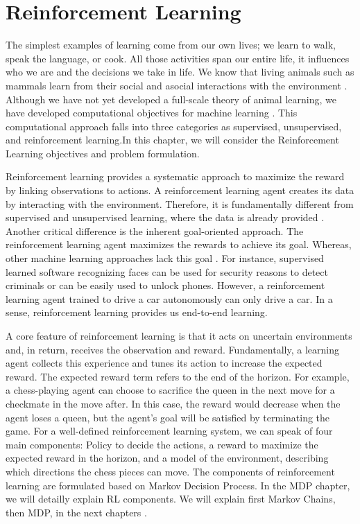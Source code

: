 
\section{Reinforcement Learning}

The simplest examples of learning come from our own lives; we learn to walk, speak the language, or cook. All those activities span our entire life, it influences who we are and the decisions we take in life. We know that living animals such as mammals learn from their social and asocial interactions with the environment \cite{AnimalInt11}. 
Although we have not yet developed a full-scale theory of animal learning, we have developed computational objectives for machine learning \cite{Sutton2018}. 
This computational approach falls into three categories as supervised, unsupervised, and reinforcement learning.In this chapter, we will consider the Reinforcement Learning objectives and problem formulation.

Reinforcement learning provides a systematic approach to maximize the reward by linking observations to actions. A reinforcement learning agent creates its data by interacting with the environment. Therefore, it is fundamentally different from supervised and unsupervised learning, where the data is already provided \cite{Sutton2018}. 
Another critical difference is the inherent goal-oriented approach. The reinforcement learning agent maximizes the rewards to achieve its goal. Whereas, other machine learning approaches lack this goal \cite{Sutton2018}.
For instance, supervised learned software recognizing faces can be used for security reasons to detect criminals or can be easily used to unlock phones. However, a reinforcement learning agent trained to drive a car autonomously can only drive a car. In a sense, reinforcement learning provides us end-to-end learning.

A core feature of reinforcement learning is that it acts on uncertain environments and, in return, receives the observation and reward. Fundamentally, a learning agent collects this experience and tunes its action to increase the expected reward. The expected reward term refers to the end of the horizon. For example, a chess-playing agent can choose to sacrifice the queen in the next move for a checkmate in the move after. In this case, the reward would decrease when the agent loses a queen, but the agent's goal will be satisfied by terminating the game. For a well-defined reinforcement learning system, we can speak of four main components: Policy to decide the actions, a reward to maximize the expected reward in the horizon, and a model of the environment, describing which directions the chess pieces can move. The components of reinforcement learning are formulated based on Markov Decision Process. In the MDP chapter, we will detailly explain RL components. We will explain first Markov Chains, then MDP,  in the next chapters \cite{PerezMIT}.

